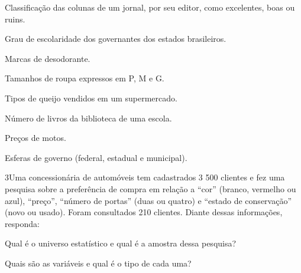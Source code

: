 {\begin{escolha}
\item
  Classificação das colunas de um jornal, por seu editor, como
  excelentes, boas ou ruins.


\item
  Grau de escolaridade dos governantes dos estados brasileiros.


\item
  Marcas de desodorante.


\item
  Tamanhos de roupa expressos em P, M e G.


\item
  Tipos de queijo vendidos em um supermercado.


\item
  Número de livros da biblioteca de uma escola.


\item
  Preços de motos.


\item
  Esferas de governo (federal, estadual e municipal).

\end{escolha}


\num{3}Uma concessionária de automóveis tem cadastrados 3 500 clientes e
fez uma pesquisa sobre a preferência de compra em relação a ``cor''
(branco, vermelho ou azul), ``preço'', ``número de portas'' (duas ou
quatro) e ``estado de conservação'' (novo ou usado). Foram consultados
210 clientes. Diante dessas informações, responda:

\begin{escolha}
\item
  Qual é o universo estatístico e qual é a amostra dessa pesquisa?


\item
  Quais são as variáveis e qual é o tipo de cada uma?



\end{escolha}}
